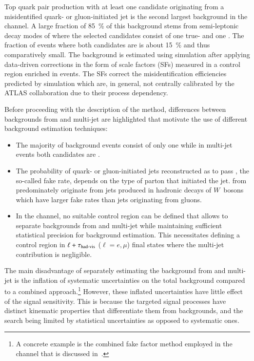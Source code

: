 Top quark pair production with at least one \tauhadvis candidate
originating from a misidentified quark- or gluon-initiated jet is the
second largest background in the \hadhad channel. A large fraction of
\SI{85}{\percent} of this background stems from semi-leptonic decay
modes of \ttbar where the selected \tauhadvis candidates consist of
one true- and one \faketauhadvis. The fraction of \ttbarFakes events
where both candidates are \faketauhadvis is about \SI{15}{\percent}
and thus comparatively small. The \ttbarFakes background is estimated
using simulation after applying data-driven corrections in the form of
\faketauhadvis scale factors (SFs) measured in a control region
enriched in \ttbar events. The SFs correct the \jettotauhadvis
misidentification efficiencies predicted by simulation which are, in
general, not centrally calibrated by the ATLAS collaboration due to
their process dependency.

Before proceeding with the description of the method, differences
between \faketauhadvis backgrounds from \ttbar and multi-jet are
highlighted that motivate the use of different background estimation
techniques:
\begin{itemize}

\item The majority of \ttbarFakes background events consist of only
  one \faketauhadvis while in multi-jet events both candidates are
  \faketauhadvis.

\item The probability of quark- or gluon-initiated jets reconstructed
  as \tauhadvis to pass \tauid, the so-called fake rate, depends on
  the type of parton that initiated the jet. \Faketauhadvis from
  \ttbar predominately originate from jets produced in hadronic decays
  of $W$~bosons which have larger fake rates than jets originating
  from gluons.

\item In the \hadhad channel, no suitable \ttbarFakes control region
  can be defined that allows to separate \faketauhadvis backgrounds
  from \ttbar and multi-jet while maintaining sufficient statistical
  precision for background estimation. This necessitates defining a
  control region in $\ell + \tau_{\text{had-vis}}$ ($\ell = e, \mu$) final states
  where the multi-jet contribution is negligible.

\end{itemize}
The main disadvantage of separately estimating the \faketauhadvis
background from \ttbar and multi-jet is the inflation of systematic
uncertainties on the total \faketauhadvis background compared to a
combined approach.\footnote{A concrete example is the combined fake
  factor method employed in the \lephad channel that is discussed
  in~.} However, these inflated
uncertainties have little effect of the signal sensitivity. This is
because the targeted signal processes have distinct kinematic
properties that differentiate them from \faketauhadvis backgrounds,
and the search being limited by statistical uncertainties as opposed
to systematic ones.


